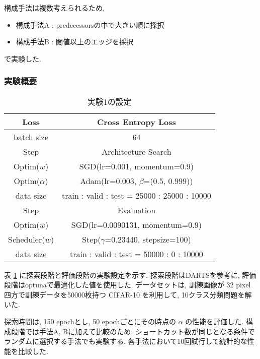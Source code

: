 構成手法は複数考えられるため,
\begin{itemize}
  \item 構成手法A : predecessorsの中で大きい順に採択
  \item 構成手法B : 閾値以上のエッジを採択
\end{itemize}
で実験した.


\changeindent{0cm}
\subsubsection{実験概要}
\label{sec:pred.01_03}
\changeindent{2cm}


\begin{table}[tb]
  \begin{center}
    \caption{実験1の設定}
  	\vspace{3mm}
    \begin{tabular}{|c|c|} \hline
      Loss & Cross Entropy Loss \\ \hline
      batch size & 64 \\ \hline\hline
      Step & Architecture Search \\ \hline
      Optim($w$) & SGD(lr=0.001, momentum=0.9) \\ \hline
      Optim($\alpha$) & Adam(lr=0.003, $\beta$=(0.5, 0.999)) \\ \hline
      data size & train : valid : test = 25000 : 25000 : 10000\\ \hline\hline
      Step & Evaluation \\ \hline
      Optim($w$) & SGD(lr=0.0090131, momentum=0.9) \\ \hline
      Scheduler($w$) & Step($\gamma$=0.23440, stepsize=100) \\ \hline
      data size & train : valid : test = 50000 : 0 : 10000\\ \hline
    \end{tabular}
    \label{tab:setting1}
  \end{center}
\end{table}

表 \ref{tab:setting1} に探索段階と評価段階の実験設定を示す.
探索段階はDARTSを参考に, 評価段階はoptunaで最適化した値を使用した.
データセットは, 訓練画像が 32 pixel 四方で訓練データを50000枚持つ CIFAR-10 を利用して,
10クラス分類問題を解いた.

探索時間は, 150 epochとし, 50 epochごとにその時点の $\alpha$ の性能を評価した.
構成段階では手法A, Bに加えて比較のため,
ショートカット数が同じとなる条件でランダムに選択する手法でも実験する.
各手法において10回試行して統計的な性能を比較した.



